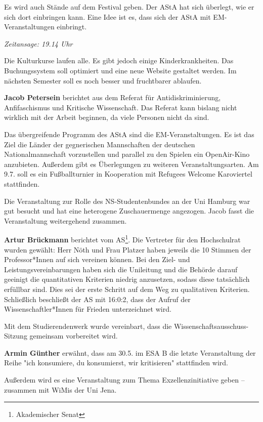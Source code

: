 \documentclass[ngerman,headheight=70pt]{scrartcl}
\begin{document}
    Es wird auch Stände auf dem Festival geben. Der AStA hat sich überlegt, wie
    er sich dort einbringen kann. Eine Idee ist es, dass sich der AStA mit
     EM-Veranstaltungen einbringt.

    \textit{Zeitansage: 19.14 Uhr}

    Die Kulturkurse laufen alle. Es gibt jedoch einige Kinderkrankheiten. Das
    Buchungssystem soll optimiert und eine neue Website gestaltet werden. Im
    nächsten Semester soll es noch besser und fruchtbarer ablaufen.

    \textbf{Jacob Petersein} berichtet aus dem Referat für Antidiskriminierung,
    Anfifaschismus und Kritische Wissenschaft. Das Referat kann bislang nicht
    wirklich mit der Arbeit beginnen, da viele Personen nicht da sind.

    Das übergreifende Programm des AStA sind die EM-Veranstaltungen. Es ist das
    Ziel die Länder der gegnerischen Mannschaften der deutschen Nationalmannschaft
    vorzustellen und parallel zu den Spielen ein OpenAir-Kino anzubieten. Außerdem
    gibt es Überlegungen zu weiteren Veranstaltungsarten. Am 9.7. soll es ein
    Fußballturnier in Kooperation mit Refugees Welcome Karoviertel stattfinden.

    Die Veranstaltung zur Rolle des NS-Studentenbundes an der Uni Hamburg war
    gut besucht und hat eine heterogene Zuschauermenge angezogen. Jacob fasst
    die Veranstaltung weitergehend zusammen.

    \textbf{Artur Brückmann} berichtet vom AS\footnote{Akademischer Senat}.
    Die Vertreter für den Hochschulrat wurden gewählt: Herr Nöth und Frau Platzer
    haben jeweils die 10 Stimmen der Professor*Innen auf sich vereinen können.
    Bei den Ziel- und Leistungsvereinbarungen haben sich die Unileitung und die
    Behörde darauf geeinigt die quantitativen Kriterien niedrig anzusetzen, sodass
    diese tatsächlich erfüllbar sind. Dies sei der erste Schritt auf dem Weg zu
    qualitativen Kriterien. Schließlich beschließt der AS mit 16:0:2, dass der
    Aufruf der Wissenschaftler*Innen für Frieden unterzeichnet wird.

    Mit dem Studierendenwerk wurde vereinbart, dass die
    Wissenschaftsausschuss-Sitzung gemeinsam vorbereitet wird.

    \textbf{Armin Günther} erwähnt, dass am 30.5. im ESA B die letzte Veranstaltung
    der Reihe "ich konsumiere, du konsumierst, wir kritisieren" stattfinden wird.

    Außerdem wird es eine Veranstaltung zum Thema Exzellenzinitiative geben --
    zusammen mit WiMis der Uni Jena.
\end{document}
